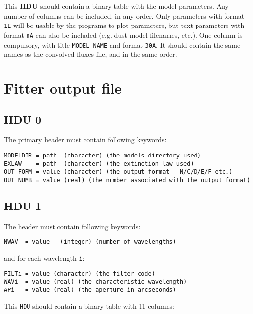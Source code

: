 \documentclass[11pt]{article}
\begin{document}
This \textbf{HDU} should contain a binary table with the model parameters. Any number of columns can be included, in any order. Only parameters with format \texttt{1E} will be usable by the programs to plot parameters, but text parameters with format \texttt{nA} can also be included (e.g. dust model filenames, etc.). One column is compulsory, with title \texttt{MODEL\_NAME} and format \texttt{30A}. It should contain the same names as the convolved fluxes file, and in the same order.

\section{Fitter output file}

\subsection{HDU 0}

The primary header must contain following keywords:

\begin{verbatim}
MODELDIR = path  (character) (the models directory used)
EXLAW    = path  (character) (the extinction law used)
OUT_FORM = value (character) (the output format - N/C/D/E/F etc.)
OUT_NUMB = value (real) (the number associated with the output format)
\end{verbatim}

\subsection{HDU 1}

The header must contain following keywords:

\begin{verbatim}
NWAV  = value   (integer) (number of wavelengths)
\end{verbatim}

and for each wavelength \texttt{i}:

\begin{verbatim}
FILTi = value (character) (the filter code)
WAVi  = value (real) (the characteristic wavelength)
APi   = value (real) (the aperture in arcseconds)
\end{verbatim}

This \texttt{HDU} should contain a binary table with 11 columns:
\end{document}
